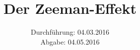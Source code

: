 

\subject{Versuch 27}
\title{Der Zeeman-Effekt}
\date{Durchführung: 04.03.2016\\
      Abgabe: 04.05.2016}



\maketitle
\newpage








\printbibliography


